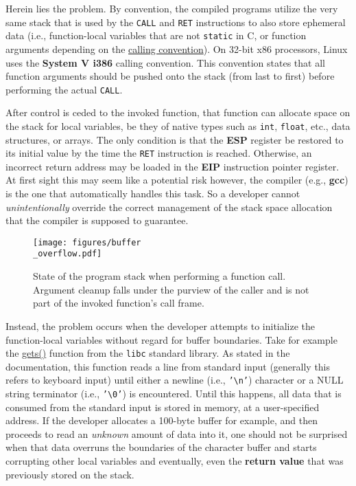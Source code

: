 Herein lies the problem. By convention, the compiled programs utilize the very
same stack that is used by the \texttt{CALL} and \texttt{RET} instructions to
also store ephemeral data (i.e., function-local variables that are not
\texttt{static} in C, or function arguments depending on the
\href{https://wiki.osdev.org/Calling_Conventions}{calling convention}). On
32-bit x86 processors, Linux uses the \textbf{System V i386} calling convention.
This convention states that all function arguments should be pushed onto the
stack (from last to first) before performing the actual \texttt{CALL}.

After control is ceded to the invoked function, that function can allocate space
on the stack for local variables, be they of native types such as \texttt{int},
\texttt{float}, etc., data structures, or arrays. The only condition is that
the \textbf{ESP} register be restored to its initial value by the time the
\texttt{RET} instruction is reached. Otherwise, an incorrect return address may
be loaded in the \textbf{EIP} instruction pointer register. At first sight this
may seem like a potential risk however, the compiler (e.g., \textbf{gcc}) is the
one that automatically handles this task. So a developer cannot
\textit{unintentionally} override the correct management of the stack space
allocation that the compiler is supposed to guarantee.

\begin{wrapfigure}{l}{0.6 \textwidth}
    \centering
    \texttt{[image: figures/buffer\\\_overflow.pdf]}
    \caption{State of the program stack when performing a function call.
             Argument cleanup falls under the purview of the caller and is not
             part of the invoked function's call frame.}
    \label{fig:call-stack}
\end{wrapfigure}

Instead, the problem occurs when the developer attempts to initialize the
function-local variables without regard for buffer boundaries. Take for example
the \href{https://www.man7.org/linux/man-pages/man3/gets.3.html}{gets()}
function from the \texttt{libc} standard library. As stated in the documentation,
this function reads a line from standard input (generally this refers to
keyboard input) until either a newline (i.e., \texttt{'\textbackslash n'})
character or a NULL string terminator (i.e., \texttt{'\textbackslash 0'}) is
encountered. Until this happens, all data that is consumed from the standard
input is stored in memory, at a user-specified address. If the developer
allocates a 100-byte buffer for example, and then proceeds to read an
\textit{unknown} amount of data into it, one should not be surprised when that
data overruns the boundaries of the character buffer and starts corrupting other
local variables and eventually, even the \textbf{return value} that was
previously stored on the stack.

